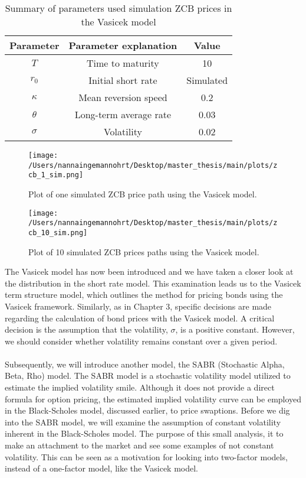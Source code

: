 \begin{table}[H]
    \centering
    \begin{tabular}{ccc}
      \toprule
      \textbf{Parameter} & \textbf{Parameter explanation} & \textbf{Value} \\
      \midrule
      \rowcolor{lightgray!40} $T$ & Time to maturity & 10 \\
      $r_0$ & Initial short rate & Simulated \\
      \rowcolor{lightgray!40} $\kappa$ & Mean reversion speed & 0.2\\
      $\theta$ & Long-term average rate  & 0.03 \\
      \rowcolor{lightgray!40} $\sigma$ & Volatility& 0.02 \\
      \bottomrule
    \end{tabular}
    \caption{Summary of parameters used simulation ZCB prices in the Vasicek model}
    \label{tab:parameters_zcb}
\end{table}
\noindent
\begin{figure}[H]
    \centering
    \texttt{[image: /Users/nannaingemannohrt/Desktop/master\_thesis/main/plots/zcb\_1\_sim.png]}
    \caption{Plot of one simulated ZCB price path using the Vasicek model.}
    \label{fig:zcb_sim_1_plot}
\end{figure}
\noindent
\begin{figure}[H]
    \centering
    \texttt{[image: /Users/nannaingemannohrt/Desktop/master\_thesis/main/plots/zcb\_10\_sim.png]}
    \caption{Plot of 10 simulated  ZCB prices  paths using the Vasicek model.}
    \label{fig:zcb_sim_10_plot}
\end{figure}
\noindent
The Vasicek model has now been introduced and we have taken a closer look at the distribution in the short rate model. 
This examination leads us to the Vasicek term structure model, which outlines the method for pricing bonds using the 
Vasicek framework. Similarly, as in Chapter 3, specific decisions are made regarding the calculation of bond prices with 
the Vasicek model. A critical decision is the assumption that the volatility, 
$\sigma$, is a positive constant. However, we should consider whether volatility remains constant over a given period.
\\\\
Subsequently, we will introduce another model, the SABR (Stochastic Alpha, Beta, Rho) model. The SABR model is a stochastic volatility model 
utilized to estimate the implied volatility smile. Although it does not provide a direct formula for option pricing, 
the estimated implied volatility curve can be employed in the Black-Scholes model, discussed earlier, to price swaptions. 
Before we dig into the SABR model, we will examine the assumption of constant volatility inherent in the Black-Scholes model.
The purpose of this small analysis, it to make an attachment to the
market and see some examples of not constant volatility. This can 
be seen as a motivation for looking into two-factor models, 
instead of a one-factor model, like the Vasicek model. 

